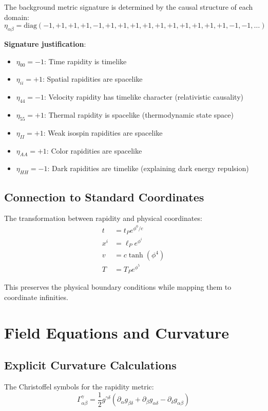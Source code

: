 \documentclass[12pt,a4paper]{article}
\begin{document}
The background metric signature is determined by the causal structure of each domain:
\begin{equation}
\eta_{\alpha\beta} = \text{diag}(-1, +1, +1, +1, -1, +1, +1, +1, +1, +1, +1, +1, +1, +1, +1, -1, -1, \ldots)
\end{equation}

\textbf{Signature justification}:
\begin{itemize}
\item $\eta_{00} = -1$: Time rapidity is timelike
\item $\eta_{ii} = +1$: Spatial rapidities are spacelike  
\item $\eta_{44} = -1$: Velocity rapidity has timelike character (relativistic causality)
\item $\eta_{55} = +1$: Thermal rapidity is spacelike (thermodynamic state space)
\item $\eta_{II} = +1$: Weak isospin rapidities are spacelike
\item $\eta_{AA} = +1$: Color rapidities are spacelike
\item $\eta_{HH} = -1$: Dark rapidities are timelike (explaining dark energy repulsion)
\end{itemize}

\subsection{Connection to Standard Coordinates}

The transformation between rapidity and physical coordinates:
\begin{align}
t &= t_P e^{\phi^0/c} \\
x^i &= \ell_P e^{\phi^i} \\
v &= c \tanh(\phi^4) \\
T &= T_P e^{\phi^5}
\end{align}

This preserves the physical boundary conditions while mapping them to coordinate infinities.

\section{Field Equations and Curvature}

\subsection{Explicit Curvature Calculations}

The Christoffel symbols for the rapidity metric:
\begin{equation}
\Gamma^\gamma_{\alpha\beta} = \frac{1}{2} g^{\gamma\delta} (\partial_\alpha g_{\beta\delta} + \partial_\beta g_{\alpha\delta} - \partial_\delta g_{\alpha\beta})
\end{equation}
\end{document}

